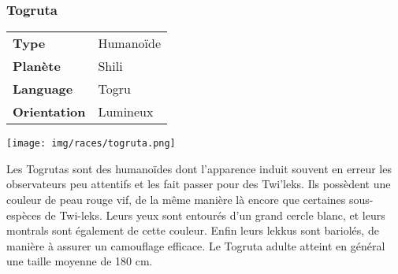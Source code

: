 \subsubsection{Togruta}

\begin{tabular}{ l l }
	\textbf{Type} 			& Humanoïde \\
   	\textbf{Planète} 		& Shili \\
   	\textbf{Language} 		& Togru \\
   	\textbf{Orientation} 	& Lumineux \\
\end{tabular}

\vspace{-9\baselineskip}
\begin{flushright}
\texttt{[image: img/races/togruta.png]}
\end{flushright}

\vspace{-2\baselineskip}

Les Togrutas sont des humanoïdes dont l'apparence induit souvent en erreur les observateurs peu attentifs et les fait passer pour des Twi'leks. Ils possèdent une couleur de peau rouge vif, de la même manière là encore que certaines sous-espèces de Twi-leks. Leurs yeux sont entourés d'un grand cercle blanc, et leurs montrals sont également de cette couleur. Enfin leurs lekkus sont bariolés, de manière à assurer un camouflage efficace. Le Togruta adulte atteint en général une taille moyenne de 180 cm. 


